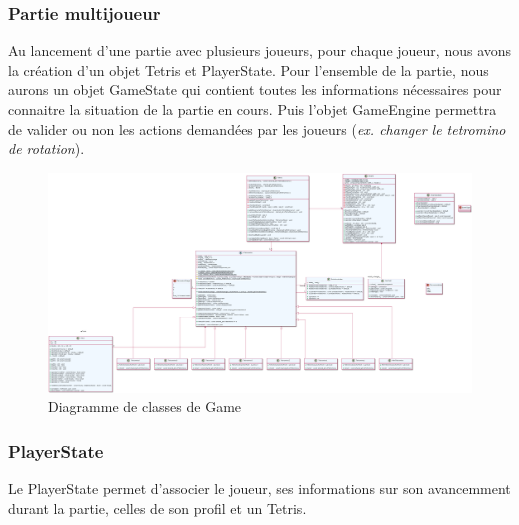 \documentclass{article}
\begin{document}
\subsubsection{Partie multijoueur}

Au lancement d'une partie avec plusieurs joueurs, pour chaque joueur, nous avons la création d'un objet Tetris et PlayerState. Pour l'ensemble de la partie, nous aurons un objet GameState qui contient toutes les informations nécessaires pour connaitre la situation de la partie en cours. Puis l'objet GameEngine permettra de valider ou non les actions demandées par les joueurs (\textit{ex. changer le tetromino de rotation}).

\newpage

\begin{figure}[!h]
	\centering
	 \includegraphics[scale=0.2, angle=90]{../res/uml/class/GameClass.png}
	 \caption{Diagramme de classes de Game}
	 \label{fig:main-menu}
\end{figure}

\subsubsection*{PlayerState}

Le PlayerState permet d'associer le joueur, ses informations sur son avancemment durant la partie, celles de son profil et un Tetris.
\end{document}
